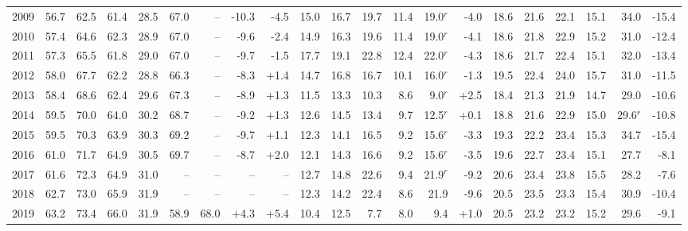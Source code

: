 \begin{table}[!h]
{\begin{threeparttable}
\begin{tabular}[t]{lrrrrrrrrrrrrrrrrrrrr}
\hspace{1em}2009 & 56.7 & 62.5 & 61.4 & 28.5 & 67.0 & -- & -10.3 & -4.5 & 15.0 & 16.7 & 19.7 & 11.4 & 19.0$^{r}$ & -4.0 & 18.6 & 21.6 & 22.1 & 15.1 & 34.0 & -15.4\\
\hspace{1em}2010 & 57.4 & 64.6 & 62.3 & 28.9 & 67.0 & -- & -9.6 & -2.4 & 14.9 & 16.3 & 19.6 & 11.4 & 19.0$^{r}$ & -4.1 & 18.6 & 21.8 & 22.9 & 15.2 & 31.0 & -12.4\\
\hspace{1em}2011 & 57.3 & 65.5 & 61.8 & 29.0 & 67.0 & -- & -9.7 & -1.5 & 17.7 & 19.1 & 22.8 & 12.4 & 22.0$^{r}$ & -4.3 & 18.6 & 21.7 & 22.4 & 15.1 & 32.0 & -13.4\\
\hspace{1em}2012 & 58.0 & 67.7 & 62.2 & 28.8 & 66.3 & -- & -8.3 & +1.4 & 14.7 & 16.8 & 16.7 & 10.1 & 16.0$^{r}$ & -1.3 & 19.5 & 22.4 & 24.0 & 15.7 & 31.0 & -11.5\\
\hspace{1em}2013 & 58.4 & 68.6 & 62.4 & 29.6 & 67.3 & -- & -8.9 & +1.3 & 11.5 & 13.3 & 10.3 & 8.6 & 9.0$^{r}$ & +2.5 & 18.4 & 21.3 & 21.9 & 14.7 & 29.0 & -10.6\\
\hspace{1em}2014 & 59.5 & 70.0 & 64.0 & 30.2 & 68.7 & -- & -9.2 & +1.3 & 12.6 & 14.5 & 13.4 & 9.7 & 12.5$^{r}$ & +0.1 & 18.8 & 21.6 & 22.9 & 15.0 & 29.6$^{r}$ & -10.8\\
\hspace{1em}2015 & 59.5 & 70.3 & 63.9 & 30.3 & 69.2 & -- & -9.7 & +1.1 & 12.3 & 14.1 & 16.5 & 9.2 & 15.6$^{r}$ & -3.3 & 19.3 & 22.2 & 23.4 & 15.3 & 34.7 & -15.4\\
\hspace{1em}2016 & 61.0 & 71.7 & 64.9 & 30.5 & 69.7 & -- & -8.7 & +2.0 & 12.1 & 14.3 & 16.6 & 9.2 & 15.6$^{r}$ & -3.5 & 19.6 & 22.7 & 23.4 & 15.1 & 27.7 & -8.1\\
\hspace{1em}2017 & 61.6 & 72.3 & 64.9 & 31.0 & -- & -- & -- & -- & 12.7 & 14.8 & 22.6 & 9.4 & 21.9$^{r}$ & -9.2 & 20.6 & 23.4 & 23.8 & 15.5 & 28.2 & -7.6\\
\hspace{1em}2018 & 62.7 & 73.0 & 65.9 & 31.9 & -- & -- & -- & -- & 12.3 & 14.2 & 22.4 & 8.6 & 21.9 & -9.6 & 20.5 & 23.5 & 23.3 & 15.4 & 30.9 & -10.4\\
\hspace{1em}2019 & 63.2 & 73.4 & 66.0 & 31.9 & 58.9 & 68.0 & +4.3 & +5.4 & 10.4 & 12.5 & 7.7 & 8.0 & 9.4 & +1.0 & 20.5 & 23.2 & 23.2 & 15.2 & 29.6 & -9.1\\

\end{tabular}
\end{threeparttable}}
\end{table}
